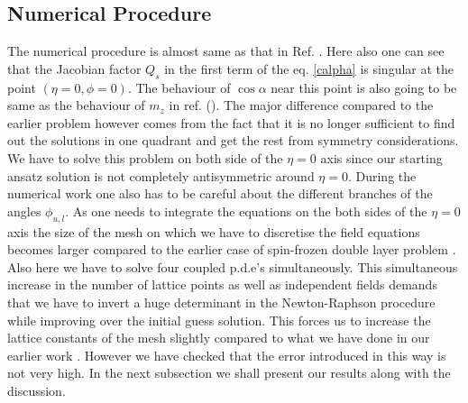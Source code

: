 \subsection{Numerical Procedure}
The numerical procedure is almost same as that in Ref. \cite{Ghosh2}.
Here also one can see that the Jacobian factor $Q_{s}$ in the
first term of the eq. \ref{calpha} 
is singular at the point
$(\eta=0,\phi=0)$. The behaviour of $\cos \alpha$ near this
point is also going to be
same as the behaviour of $m_z$ in ref. (\cite{Ghosh2}). 
The major difference compared to the earlier problem however
comes from the fact that it is no longer
sufficient to find out the solutions in one quadrant and
get the rest from symmetry considerations.
We have to solve this problem
on both side of the $\eta = 0$ axis since our starting ansatz solution
is not completely antisymmetric
around $\eta = 0$.
During the numerical work one also has to be careful about
the different branches of the angles $\phi_{u,l}$. As one needs to 
integrate the
equations on the both sides of the $\eta = 0$ axis the size of the mesh
on which we have to discretise the field equations becomes larger compared
to the earlier case of spin-frozen double layer problem \cite{Ghosh2}.
Also here we have to solve four coupled p.d.e's simultaneously. 
This simultaneous increase in the number of lattice points
as well as independent fields demands that we have to invert a
huge determinant in the Newton-Raphson procedure \cite{numer}
while improving over the initial guess solution. This forces us
to increase the lattice constants of the mesh slightly compared to
what we have done in our earlier work \cite{Ghosh2}.
However we have checked that the error
introduced in this way is not very high. In the next
subsection we shall present
our results along with the discussion.

